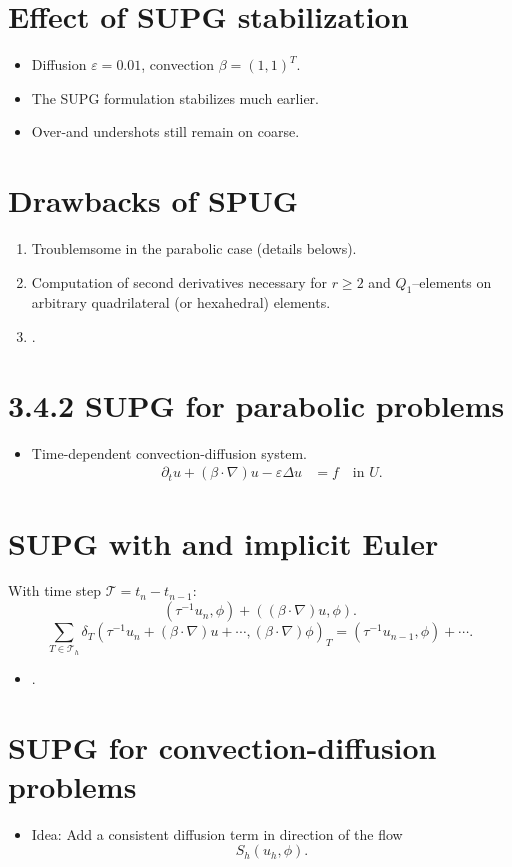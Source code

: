 \documentclass[
	a4paper,
	11pt,
	oneside
]{scrreprt}
\theoremstyle{definition}
\begin{document}
\section{Effect of SUPG stabilization}

\begin{itemize}
	\item Diffusion $\varepsilon=0.01$, convection $\beta={\left(1,1\right)}^{T}$.
	\item The SUPG formulation stabilizes much earlier.
	\item Over-and undershots still remain on coarse.
\end{itemize}

\section{Drawbacks of SPUG}

\begin{enumerate}
\item Troublemsome in the parabolic case (details belows).
\item Computation of second derivatives necessary for $r\ge2$ and $Q_{1}$--elements on arbitrary quadrilateral (or hexahedral) elements.
\item .
\end{enumerate}

\section{3.4.2 SUPG for parabolic problems}

\begin{itemize}
	\item Time-dependent convection-diffusion system.
	\begin{align*}
	\partial_{t}u+\left(\beta\cdot\nabla\right)u-\varepsilon\Delta u&=f\quad\text{in }U.
	\end{align*}
\end{itemize}

\section{SUPG with and implicit Euler}

With time step $\mathcal{T}=t_{n}-t_{n-1}$: \[ \left(\tau^{-1}u_{n},\phi\right)+\left(\left(\beta\cdot\nabla\right)u,\phi\right).  \] \[ \sum_{T\in \mathcal{T}_{h}}\delta_{T}{\left(\tau^{-1}u_{n}+\left(\beta\cdot\nabla\right)u+\cdots,\left(\beta\cdot\nabla\right)\phi\right)}_{T}=\left(\tau^{-1}u_{n-1},\phi\right)+\cdots. \]
\begin{itemize}
\item .
\end{itemize}

\section{SUPG for convection-diffusion problems}

\begin{itemize}
	\item Idea: Add a consistent diffusion term in direction of the flow \[ S_{h}\left(u_{h},\phi\right). \]
\end{itemize}
\end{document}
